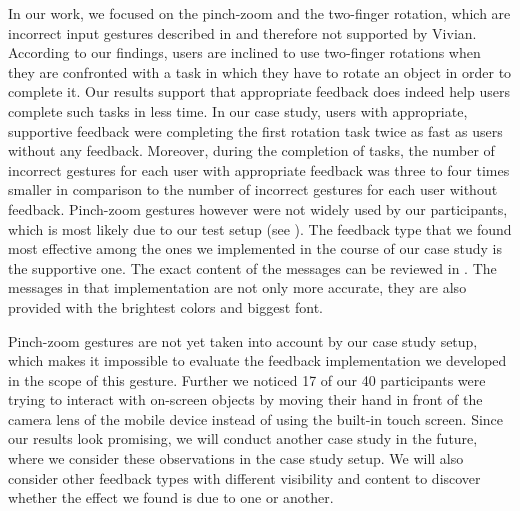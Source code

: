\documentclass[11pt, a4paper]{article}
\begin{document}
		In our work, we focused on the pinch-zoom and the two-finger rotation, which are incorrect input gestures described in  and therefore not supported by Vivian. According to our findings, users are inclined to use two-finger rotations when they are confronted with a task in which they have to rotate an object in order to complete it. Our results support that appropriate feedback does indeed help users complete such tasks in less time. In our case study, users with appropriate, supportive feedback were completing the first rotation task twice as fast as users without any feedback. Moreover, during the completion of tasks, the number of incorrect gestures for each user with appropriate feedback was three to four times smaller in comparison to the number of incorrect gestures for each user without feedback. Pinch-zoom gestures however were not widely used by our participants, which is most likely due to our test setup (see ). The feedback type that we found most effective among the ones we implemented in the course of our case study is the supportive one. The exact content of the messages can be reviewed in . The messages in that implementation are not only more accurate, they are also provided with the brightest colors and biggest font.

		Pinch-zoom gestures are not yet taken into account by our case study setup, which makes it impossible to evaluate the feedback implementation we developed in the scope of this gesture. Further we noticed 17 of our 40 participants were trying to interact with on-screen objects by moving their hand in front of the camera lens of the mobile device instead of using the built-in touch screen. Since our results look promising, we will conduct another case study in the future, where we consider these observations in the case study setup. We will also consider other feedback types with different visibility and content to discover whether the effect we found is due to one or another.

	\pagebreak
	\printbibliography
\restoregeometry
\end{document}

